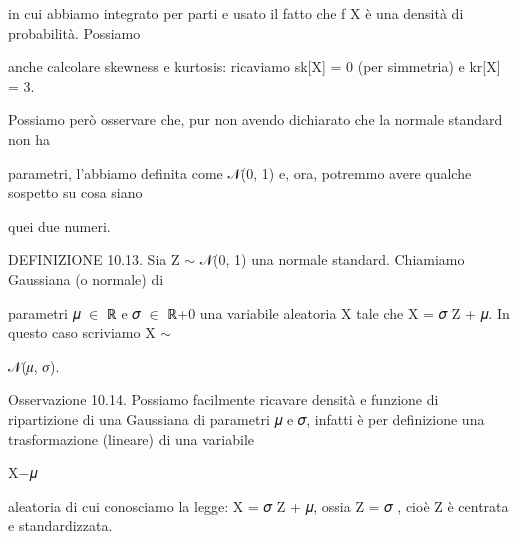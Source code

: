 \documentclass[a4paper,portrait,12pt]{article}
\begin{document}
\begin{flushleft}
in cui abbiamo integrato per parti e usato il fatto che f X \`{e} una densit\`{a} di probabilit\`{a}. Possiamo
\end{flushleft}


\begin{flushleft}
anche calcolare skewness e kurtosis: ricaviamo sk[X] = 0 (per simmetria) e kr[X] = 3.
\end{flushleft}


\begin{flushleft}
Possiamo per\`{o} osservare che, pur non avendo dichiarato che la normale standard non ha
\end{flushleft}


\begin{flushleft}
parametri, l'abbiamo definita come 𝒩(0, 1) e, ora, potremmo avere qualche sospetto su cosa siano
\end{flushleft}


\begin{flushleft}
quei due numeri.
\end{flushleft}


\begin{flushleft}
DEFINIZIONE 10.13. Sia Z $\sim$ 𝒩(0, 1) una normale standard. Chiamiamo Gaussiana (o normale) di
\end{flushleft}


\begin{flushleft}
parametri 𝜇 $\in$ ℝ e 𝜎 $\in$ ℝ+0 una variabile aleatoria X tale che X = 𝜎 Z + 𝜇. In questo caso scriviamo X $\sim$
\end{flushleft}


\begin{flushleft}
𝒩(𝜇, 𝜎).
\end{flushleft}


\begin{flushleft}
Osservazione 10.14. Possiamo facilmente ricavare densit\`{a} e funzione di ripartizione di una Gaussiana di parametri 𝜇 e 𝜎, infatti \`{e} per definizione una trasformazione (lineare) di una variabile
\end{flushleft}


\begin{flushleft}
X$-$𝜇
\end{flushleft}


\begin{flushleft}
aleatoria di cui conosciamo la legge: X = 𝜎 Z + 𝜇, ossia Z = 𝜎 , cio\`{e} Z \`{e} centrata e standardizzata.
\end{flushleft}
\end{document}

